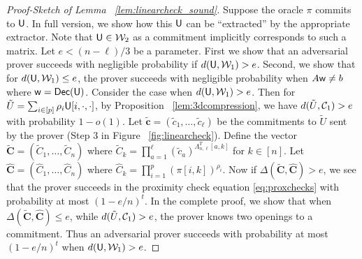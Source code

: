 \begin{proof}[Proof-Sketch of Lemma ~\ref{lem:linearcheck_sound}]
Suppose the oracle $\pi$ commits to $\mathsf{U}$. In full version, we show how
 this $\mathsf{U}$ can be ``extracted'' by the appropriate extractor. Note that $\mathsf{U}\in
\mathcal{W}_2$ as a commitment implicitly corresponds to such a matrix. Let $e<(n-\ell)/3$ be a parameter. First we show that 
an adversarial prover succeeds with negligible probability if $d(\mathsf{U},\mathcal{W}_1)>e$. Second, we
show that for $d(\mathsf{U},\mathcal{W}_1)\leq e$, the prover succeeds with negligible probability when
$A\mathsf{w}\neq b$ where $\mathsf{w}=\mathsf{Dec}(\mathsf{U})$. Consider the case when $d(\mathsf{U},\mathcal{W}_1)>e$. Then for
$\tilde{U}=\sum_{i\in [p]}\rho_i\mathsf{U}[i,\cdot,\cdot]$, by Proposition ~\ref{lem:3dcompression},
 we have $d(\tilde{U},\mathcal{C}_1)>e$ with probability $1-o(1)$. Let $\tilde{\bm{c}}=(\tilde{c}_1,
\ldots,\tilde{c}_\ell)$ be the commitments to $\tilde{U}$ sent by the prover
(Step 3 in Figure ~\ref{fig:linearcheck}). Define 
the vector $\tilde{\bm{C}}=(\tilde{C}_1,\ldots,\tilde{C}_n)$ where
$\tilde{C}_k=\prod_{a=1}^\ell (\tilde{c}_a)^{\Lambda_{n,\ell}^T[a,k]}$ for $k\in [n]$.
 Let $\hat{\bm{C}}=(\hat{C}_1,\ldots,\hat{C}_n)$ where
$\hat{C}_k=\prod_{i=1}^p(\pi[i,k])^{\rho_i}$. Now if
$\Delta(\tilde{\bm{C}},\hat{\bm{C}})>e$, we see that the prover succeeds in the
proximity check equation \eqref{eq:proxchecks} with probability at most $(1-e/n)^t$. 
In the complete
proof, we show that when $\Delta(\tilde{\bm{C}},\hat{\bm{C}})\leq e$, 
while $d(\tilde{U},\mathcal{C}_1)>e$, the prover knows two openings to a commitment.
Thus an adversarial prover succeeds with probability at most $(1-e/n)^t$ when
$d(\mathsf{U},\mathcal{W}_1)>e$.


\end{proof}
